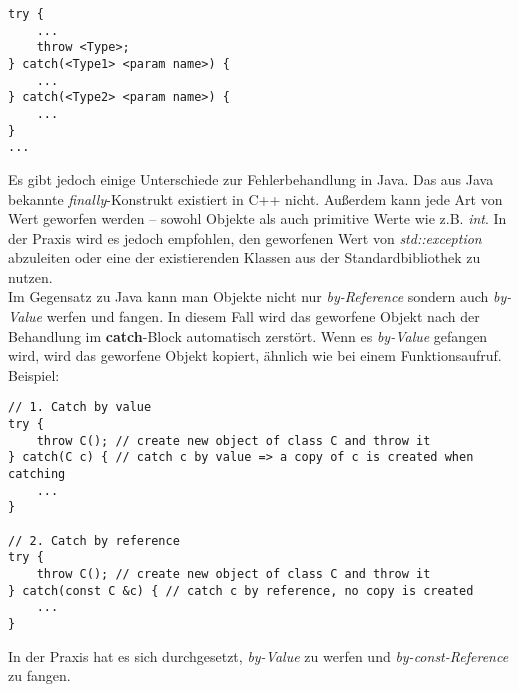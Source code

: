\begin{lstlisting}
try {
	...
	throw <Type>;
} catch(<Type1> <param name>) {
	...
} catch(<Type2> <param name>) {
	...
}
...
\end{lstlisting} 

Es gibt jedoch einige Unterschiede zur Fehlerbehandlung in Java.
Das aus Java bekannte \emph{finally}-Konstrukt existiert in C++ nicht.
Außerdem kann jede Art von Wert geworfen werden -- sowohl Objekte als auch primitive Werte wie z.B. \emph{int}.
In der Praxis wird es jedoch empfohlen, den geworfenen Wert von \emph{std::exception} abzuleiten oder eine der existierenden Klassen aus der Standardbibliothek zu nutzen. \\

Im Gegensatz zu Java kann man Objekte nicht nur \emph{by-Reference} sondern auch \emph{by-Value} werfen und fangen. In diesem Fall wird das geworfene Objekt nach der Behandlung im \textbf{catch}-Block automatisch zerstört. Wenn es \emph{by-Value} gefangen wird, wird das geworfene Objekt kopiert, ähnlich wie bei einem Funktionsaufruf. Beispiel:

\begin{lstlisting}
// 1. Catch by value
try {
	throw C(); // create new object of class C and throw it 
} catch(C c) { // catch c by value => a copy of c is created when catching
	...
}

// 2. Catch by reference
try {
	throw C(); // create new object of class C and throw it 
} catch(const C &c) { // catch c by reference, no copy is created
	...
}
\end{lstlisting} 

In der Praxis hat es sich durchgesetzt, \emph{by-Value} zu werfen und \emph{by-const-Reference} zu fangen.

